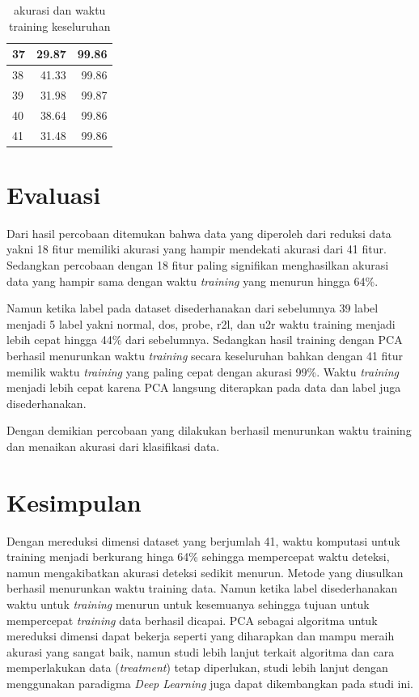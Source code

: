 \begin{table}[]
\begin{tabular}{|l|r|r|}
37             & 29.87                                   & 99.86                             \\ \hline
38             & 41.33                                   & 99.86                             \\ \hline
39             & 31.98                                   & 99.87                             \\ \hline
40             & 38.64                                   & 99.86                             \\ \hline
41             & 31.48                                   & 99.86                             \\ \hline
\end{tabular}
\centering
\caption{akurasi dan waktu training keseluruhan}
\end{table}

\FloatBarrier



\section{Evaluasi}
Dari hasil percobaan ditemukan bahwa data yang diperoleh dari reduksi data yakni 18 fitur memiliki akurasi yang hampir mendekati akurasi dari 41 fitur.
Sedangkan percobaan dengan 18 fitur paling signifikan menghasilkan akurasi data yang hampir sama dengan waktu \textit{training} yang menurun hingga 64\%. 

Namun ketika label pada dataset disederhanakan dari sebelumnya 39 label menjadi 5 label yakni normal, dos, probe, r2l, dan u2r waktu training menjadi lebih cepat hingga 44\% dari sebelumnya. Sedangkan hasil training dengan PCA berhasil menurunkan waktu \textit{training} secara keseluruhan bahkan dengan 41 fitur memilik waktu \textit{training} yang paling cepat dengan akurasi 99\%. Waktu \textit{training} menjadi lebih cepat karena PCA langsung diterapkan pada data dan label juga disederhanakan.

Dengan demikian percobaan yang dilakukan berhasil menurunkan waktu training dan menaikan akurasi dari klasifikasi data.

\section{Kesimpulan}
Dengan mereduksi dimensi dataset yang berjumlah 41, waktu komputasi untuk training menjadi berkurang hinga 64\% sehingga mempercepat waktu deteksi, namun mengakibatkan akurasi deteksi sedikit menurun. Metode yang diusulkan berhasil menurunkan waktu training data. Namun ketika label disederhanakan waktu untuk \textit{training} menurun untuk kesemuanya sehingga tujuan untuk mempercepat \textit{training} data berhasil dicapai. PCA sebagai algoritma untuk mereduksi dimensi dapat bekerja seperti yang diharapkan dan mampu meraih akurasi yang sangat baik, namun studi lebih lanjut terkait algoritma dan cara memperlakukan data (\textit{treatment}) tetap diperlukan, studi lebih lanjut dengan menggunakan paradigma \textit{Deep Learning} juga dapat dikembangkan pada studi ini.

